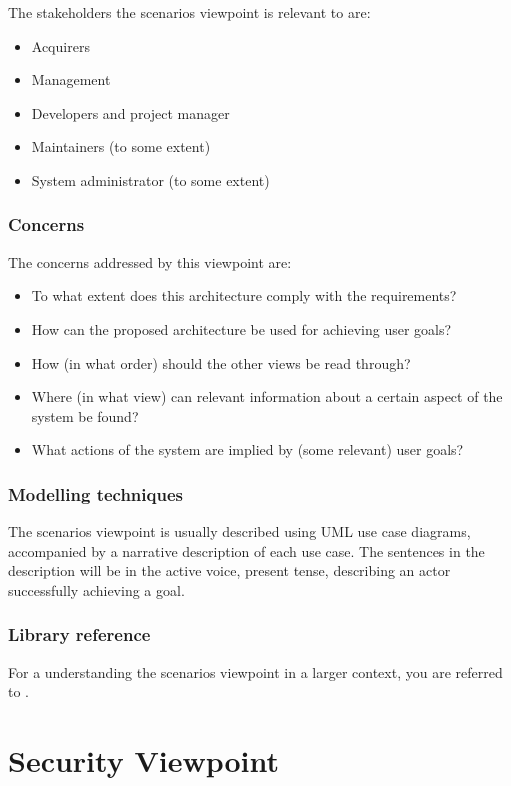 The stakeholders the scenarios viewpoint is relevant to are:

\begin{itemize}
\item Acquirers
\item Management
\item Developers and project manager
\item Maintainers (to some extent)
\item System administrator (to some extent)
\end{itemize}

\subsubsection{Concerns}

The concerns addressed by this viewpoint are:

\begin{itemize}
\item To what extent does this architecture comply with the requirements?
\item How can the proposed architecture be used for achieving user goals?
\item How (in what order) should the other views be read through?
\item Where (in what view) can relevant information about a certain aspect of the system be found?
\item What actions of the system are implied by (some relevant) user goals?
\end{itemize}

\subsubsection{Modelling techniques}

The scenarios viewpoint is usually described using UML use case diagrams, accompanied by
a narrative description of each use case. The sentences in the description will be in the active
voice, present tense, describing an actor successfully achieving a goal.

\subsubsection{Library reference}

For a understanding the scenarios viewpoint in a larger context, you are referred to \cite{kru95}.

\section{Security Viewpoint}

